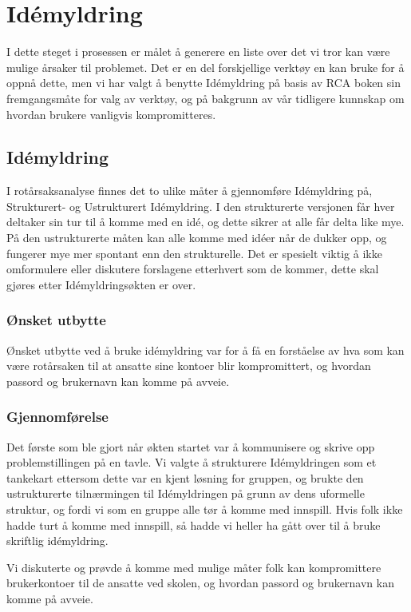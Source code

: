 \chapter{Idémyldring}
I dette steget i prosessen er målet å generere en liste over det vi tror kan være mulige årsaker til problemet. Det er en del forskjellige verktøy en kan bruke for å oppnå dette, men vi har valgt å benytte Idémyldring på basis av RCA boken \cite{RCA} sin fremgangsmåte for valg av verktøy, og på bakgrunn av vår tidligere kunnskap om hvordan brukere vanligvis kompromitteres. 

\section{Idémyldring}
I rotårsaksanalyse finnes det to ulike måter å gjennomføre Idémyldring på, Strukturert- og Ustrukturert Idémyldring. I den strukturerte versjonen får hver deltaker sin tur til å komme med en idé, og dette sikrer at alle får delta like mye. På den ustrukturerte måten kan alle komme med idéer når de dukker opp, og fungerer mye mer spontant enn den strukturelle. Det er spesielt viktig å ikke omformulere eller diskutere forslagene etterhvert som de kommer, dette skal gjøres etter Idémyldringsøkten er over.

\subsection{Ønsket utbytte}
Ønsket utbytte ved å bruke idémyldring var for å få en forståelse av hva som kan være rotårsaken til at ansatte sine kontoer blir kompromittert, og hvordan passord og brukernavn kan komme på avveie.

\subsection{Gjennomførelse}
Det første som ble gjort når økten startet var å kommunisere og skrive opp problemstillingen på en tavle. Vi valgte å strukturere Idémyldringen som et tankekart ettersom dette var en kjent løsning for gruppen, og brukte den ustrukturerte tilnærmingen til Idémyldringen på grunn av dens uformelle struktur, og fordi vi som en gruppe alle tør å komme med innspill. Hvis folk ikke hadde turt å komme med innspill, så hadde vi heller ha gått over til å bruke skriftlig idémyldring. 

Vi diskuterte og prøvde å komme med mulige måter folk kan kompromittere brukerkontoer til de ansatte ved skolen, og hvordan passord og brukernavn kan komme på avveie.

